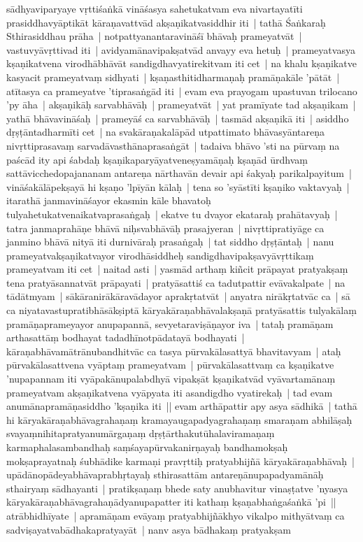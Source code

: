 \documentclass[article,12pt,a4paper]{memoir}%
\newcommand{\persName}[1]{#1}
\begin{document}
sādhyaviparyaye vṛttiśaṅkā vināśasya sahetukatvam eva nivartayatīti prasiddhavyāptikāt kāraṇavattvād akṣaṇikatvasiddhir iti | \label{thakur75-115.17} tathā Śaṅkaraḥ Sthirasiddhau prāha | notpattyanantaravināśī bhāvaḥ prameyatvāt | vastuvyāvṛttivad iti | \label{thakur75-115.18} avidyamānavipakṣatvād anvayy eva hetuḥ | prameyatvasya kṣaṇikatvena virodhābhāvāt sandigdhavyatirekitvam iti cet | \label{thakur75-115.19} na khalu kṣaṇikatve kasyacit prameyatvaṃ sidhyati | kṣaṇasthitidharmaṇaḥ pramāṇakāle 'pātāt | atītasya ca prameyatve 'tiprasaṅgād iti | \label{thakur75-115.22} evam eva prayogam upastuvan \persName{trilocano} 'py āha | akṣaṇikāḥ sarvabhāvāḥ | prameyatvāt | yat pramīyate tad akṣaṇikam | yathā bhāvavināśaḥ | prameyāś ca sarvabhāvāḥ | tasmād akṣaṇikā iti | \label{thakur75-115.25} asiddho dṛṣṭāntadharmīti cet | na svakāraṇakalāpād utpattimato bhāvasyāntareṇa nivṛttiprasavaṃ sarvadāvasthānaprasaṅgāt | tadaiva bhāvo 'sti na pūrvaṃ na paścād ity api śabdaḥ kṣaṇikaparyāyatveneṣyamāṇaḥ kṣaṇād ūrdhvaṃ sattāvicchedopajananam antareṇa nārthavān devair api śakyaḥ parikalpayitum | vināśakālāpekṣayā hi kṣaṇo 'lpīyān kālaḥ | tena so 'syāstīti kṣaṇiko vaktavyaḥ | itarathā janmavināśayor ekasmin kāle bhavatoḥ tulyahetukatvenaikatvaprasaṅgaḥ | ekatve tu dvayor ekataraḥ prahātavyaḥ | tatra janmaprahāṇe bhāvā niḥsvabhāvāḥ prasajyeran | nivṛttipratiyāge ca janmino bhāvā nityā iti durnivāraḥ prasaṅgaḥ | tat siddho dṛṣṭāntaḥ | \label{thakur75-116.1} nanu prameyatvakṣaṇikatvayor virodhāsiddheḥ sandigdhavipakṣavyāvṛttikaṃ prameyatvam iti cet | \label{thakur75-116.2} naitad asti | yasmād arthaṃ kiñcit prāpayat pratyakṣaṃ tena pratyāsannatvāt prāpayati | pratyāsattiś ca tadutpattir evāvakalpate | na tādātmyam | sākāranirākāravādayor aprakṛtatvāt | anyatra nirākṛtatvāc ca | sā ca niyatavastupratibhāsākṣiptā kāryakāraṇabhāvalakṣaṇā pratyāsattis tulyakālaṃ pramāṇaprameyayor anupapannā, sevyetaraviṣāṇayor iva | tataḥ pramāṇam arthasattāṃ bodhayat tadadhīnotpādatayā bodhayati | kāraṇabhāvamātrānubandhitvāc ca tasya pūrvakālasattyā bhavitavyam | ataḥ pūrvakālasattvena vyāptaṃ prameyatvam | pūrvakālasattvaṃ ca kṣaṇikatve 'nupapannam iti vyāpakānupalabdhyā vipakṣāt kṣaṇikatvād vyāvartamānaṃ prameyatvam akṣaṇikatvena vyāpyata iti asandigdho vyatirekaḥ | \label{thakur75-116.10} tad evam anumānapramāṇasiddho 'kṣaṇika iti || \label{thakur75-116.11} evam arthāpattir apy asya sādhikā | tathā hi kāryakāraṇabhāvagrahaṇaṃ kramayaugapadyagrahaṇaṃ smaraṇam abhilāṣaḥ svayaṃnihitapratyanumārgaṇaṃ dṛṣṭārthakutūhalaviramaṇaṃ karmaphalasambandhaḥ saṃśayapūrvakanirṇayaḥ bandhamokṣaḥ mokṣaprayatnaḥ śubhādike karmaṇi pravṛttiḥ pratyabhijñā kāryakāraṇabhāvaḥ | upādānopādeyabhāvaprabhṛtayaḥ sthirasattām antareṇānupapadyamānāḥ sthairyaṃ sādhayanti | pratikṣaṇaṃ bhede saty anubhavitur vinaṣṭatve 'nyasya kāryakāraṇabhāvagrahaṇādyanupapatter iti kathaṃ kṣaṇabhaṅgaśaṅkā 'pi || \label{thakur75-116.17} atrābhidhīyate | apramāṇam evāyaṃ pratyabhijñākhyo vikalpo mithyātvaṃ ca sadviṣayatvabādhakapratyayāt | \label{thakur75-116.18} nanv asya bādhakaṃ pratyakṣam 
\end{document}
